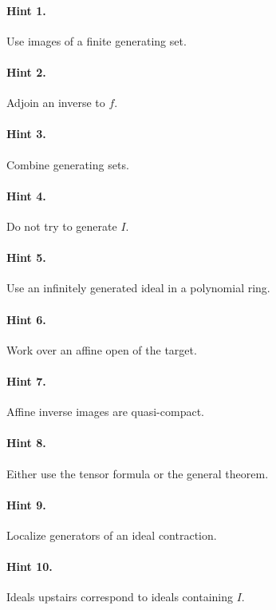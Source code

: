 \paragraph{Hint 1.} Use images of a finite generating set.

\paragraph{Hint 2.} Adjoin an inverse to $f$.

\paragraph{Hint 3.} Combine generating sets.

\paragraph{Hint 4.} Do not try to generate $I$.

\paragraph{Hint 5.} Use an infinitely generated ideal in a polynomial ring.

\paragraph{Hint 6.} Work over an affine open of the target.

\paragraph{Hint 7.} Affine inverse images are quasi-compact.

\paragraph{Hint 8.} Either use the tensor formula or the general theorem.

\paragraph{Hint 9.} Localize generators of an ideal contraction.

\paragraph{Hint 10.} Ideals upstairs correspond to ideals containing $I$.

